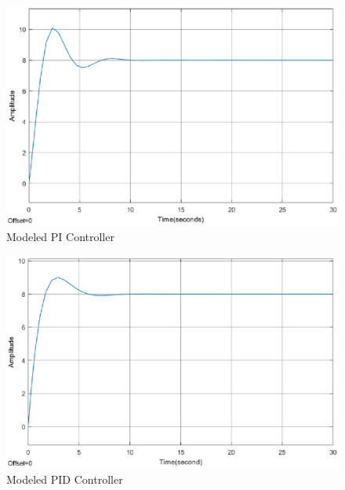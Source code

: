 \begin{figure}[H]
	\centering
	\includegraphics[width=1\textheight, height = 1\textwidth, keepaspectratio, angle = 270]{figures/06ModelValidation/modelPI.eps}
	\caption{Modeled PI Controller}
\end{figure}

\begin{figure}[H]
	\centering
	\includegraphics[width=1\textheight, height = 1\textwidth, keepaspectratio, angle = 270]{figures/06ModelValidation/modelPID.eps}
	\caption{Modeled PID Controller}
\end{figure}